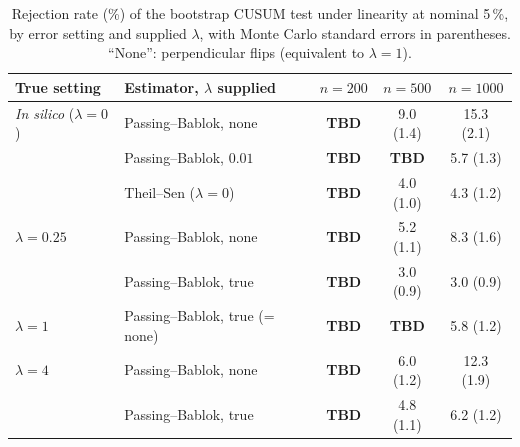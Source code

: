\begin{table}[htbp]
\centering
\caption{Rejection rate (\%) of the bootstrap CUSUM test under linearity at nominal 5\,\%, by error setting and supplied $\lambda$, with Monte Carlo standard errors in parentheses. ``None'': perpendicular flips (equivalent to $\lambda = 1$).}
\label{tab:supp:sim:cusum_lambda}
\begin{tabular}{llccc}
\hline
True setting & Estimator, $\lambda$ supplied & $n = 200$ & $n = 500$ & $n = 1000$ \\
\hline
\textit{In silico} ($\lambda = 0$) & Passing--Bablok, none          & \textbf{TBD} & 9.0 (1.4) & 15.3 (2.1) \\
                                  & Passing--Bablok, $0.01$        & \textbf{TBD} & \textbf{TBD} & 5.7 (1.3) \\
                                  & Theil--Sen ($\lambda = 0$)     & \textbf{TBD} & 4.0 (1.0) & 4.3 (1.2) \\
\hline
$\lambda = 0.25$ & Passing--Bablok, none   & \textbf{TBD} & 5.2 (1.1) & 8.3 (1.6) \\
                 & Passing--Bablok, true   & \textbf{TBD} & 3.0 (0.9) & 3.0 (0.9) \\
\hline
$\lambda = 1$    & Passing--Bablok, true (= none) & \textbf{TBD} & \textbf{TBD} & 5.8 (1.2) \\
\hline
$\lambda = 4$    & Passing--Bablok, none   & \textbf{TBD} & 6.0 (1.2) & 12.3 (1.9) \\
                 & Passing--Bablok, true   & \textbf{TBD} & 4.8 (1.1) & 6.2 (1.2) \\
\hline
\end{tabular}
\end{table}

